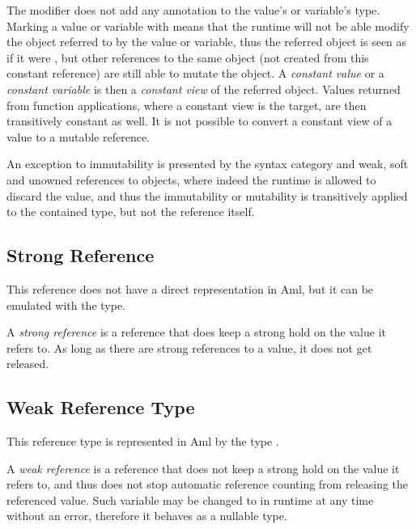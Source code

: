 The  modifier does not add any annotation to the value's or variable's type. Marking a value or variable with  means that the runtime will not be able modify the object referred to by the value or variable, thus the referred object is seen as if it were , but other references to the same object (not created from this constant reference) are still able to mutate the object. A {\em constant value} or a {\em constant variable} is then a {\em constant view} of the referred object. Values returned from function applications, where a constant view is the target, are then transitively constant as well. It is not possible to convert a constant view of a value to a mutable reference. 

An exception to immutability is presented by the  syntax category and weak, soft and unowned references to objects, where indeed the runtime is allowed to discard the value, and thus the immutability or mutability is transitively applied to the contained type, but not the reference itself. 






\subsection{Strong Reference}

This reference does not have a direct representation in Aml, but it can be emulated with the  type. 

A {\em strong reference} is a reference that does keep a strong hold on the value it refers to. As long as there are strong references to a value, it does not get released. 






\subsection{Weak Reference Type}

This reference type is represented in Aml by the type . 

A {\em weak reference} is a reference that does not keep a strong hold on the value it refers to, and thus does not stop automatic reference counting from releasing the referenced value. Such variable may be changed to  in runtime at any time without an error, therefore it behaves as a nullable type. 

